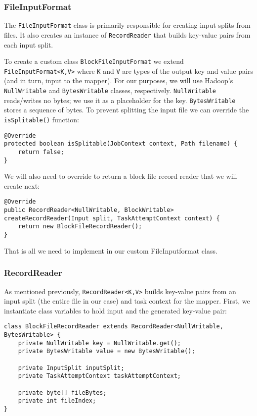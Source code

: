 \documentclass[9pt,twocolumn,twoside]{idsi}
\begin{document}
\subsubsection{FileInputFormat}
The \lstinline{FileInputFormat} class is primarily responsible for creating input splits from files. It also creates an instance of \lstinline{RecordReader} that builds key-value pairs from each input split.

To create a custom class \lstinline{BlockFileInputFormat} we extend \lstinline{FileInputFormat<K,V>} where \lstinline{K} and \lstinline{V} are types of the output key and value pairs (and in turn, input to the mapper). For our purposes, we will use Hadoop's \lstinline{NullWritable} and \lstinline{BytesWritable} classes, respectively. \lstinline{NullWritable} reads/writes no bytes; we use it as a placeholder for the key. \lstinline{BytesWritable} stores a sequence of bytes. To prevent splitting the input file we can override the \lstinline{isSplitable()} function:

\lstset{language=Java}
\begin{lstlisting}
@Override
protected boolean isSplitable(JobContext context, Path filename) {
    return false;
}
\end{lstlisting}

We will also need to override  to return a block file record reader that we will create next:

\begin{lstlisting}
@Override
public RecordReader<NullWritable, BlockWritable> createRecordReader(Input split, TaskAttemptContext context) {
    return new BlockFileRecordReader();
}
\end{lstlisting}

That is all we need to implement in our custom FileInputformat class.

\subsubsection{RecordReader}
As mentioned previously, \lstinline{RecordReader<K,V>} builds key-value pairs from an input split (the entire file in our case) and task context for the mapper. First, we instantiate class variables to hold input and the generated key-value pair:

\begin{lstlisting}
class BlockFileRecordReader extends RecordReader<NullWritable, BytesWritable> {
    private NullWritable key = NullWritable.get();
    private BytesWritable value = new BytesWritable();

    private InputSplit inputSplit;
    private TaskAttemptContext taskAttemptContext;

    private byte[] fileBytes;
    private int fileIndex;
}
\end{lstlisting}
\end{document}
